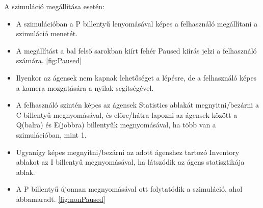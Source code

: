 \noindent A szimuláció megállítása esetén:

\begin{itemize}
    \item A szimulációban a P billentyű lenyomásával képes a felhasználó megállítani a szimuláció menetét. 
    \item A megállítást a bal felső sarokban kiírt fehér Paused kiírás jelzi a felhasználó számára. \ref{fig:Paused}
    \item Ilyenkor az ágensek nem kapnak lehetőséget a lépésre, de a felhasználó képes a kamera mozgatására a nyilak segítségével.
    \item A felhasználó szintén képes az ágensek Statistics ablakát megnyitni/bezárni a C billentyű megnyomásával, és előre/hátra lapozni az ágensek között a Q(balra) és E(jobbra) billentyűk megnyomásával, ha több van a szimulációban, mint 1.
    \item Ugyanígy képes megnyitni/bezárni az adott ágenshez tartozó Inventory ablakot az I billentyű megnyomásával, ha látszódik az ágens statisztikája ablak.
    \item A P billentyű újonnan megnyomásával ott folytatódik a szimuláció, ahol abbamaradt. \ref{fig:nonPaused}
\end{itemize}


\label{UI}

